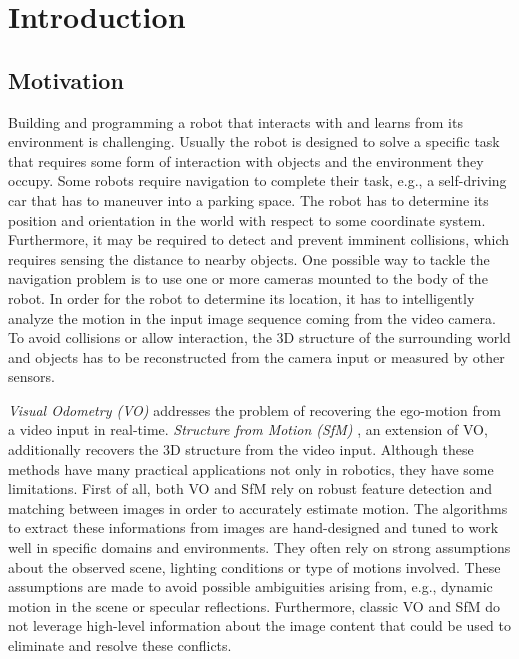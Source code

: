 \chapter{Introduction}
		
	\section{Motivation}
		
		Building and programming a robot that interacts with and learns from its environment is challenging.
		Usually the robot is designed to solve a specific task that requires some form of interaction with objects and the environment they occupy.
		Some robots require navigation to complete their task, e.g., a self-driving car that has to maneuver into a parking space.
		The robot has to determine its position and orientation in the world with respect to some coordinate system.
		Furthermore, it may be required to detect and prevent imminent collisions, which requires sensing the distance to nearby objects.
		One possible way to tackle the navigation problem is to use one or more cameras mounted to the body of the robot.
		In order for the robot to determine its location, it has to intelligently analyze the motion in the input image sequence coming from the video camera.
		To avoid collisions or allow interaction, the 3D structure of the surrounding world and objects has to be reconstructed from the camera input or measured by other sensors.
		
		\emph{Visual Odometry (VO)}  addresses the problem of recovering the ego-motion from a video input in real-time. 
		\emph{Structure from Motion (SfM)} , an extension of VO, additionally recovers the 3D structure from the video input.
		Although these methods have many practical applications not only in robotics, they have some limitations.
		First of all, both VO and SfM rely on robust feature detection and matching between images in order to accurately estimate motion.
		The algorithms to extract these informations from images are hand-designed and tuned to work well in specific domains and environments.
		They often rely on strong assumptions about the observed scene, lighting conditions or type of motions involved.
		These assumptions are made to avoid possible ambiguities arising from, e.g., dynamic motion in the scene or specular reflections.
		Furthermore, classic VO and SfM do not leverage high-level information about the image content that could be used to eliminate and resolve these conflicts.
		
